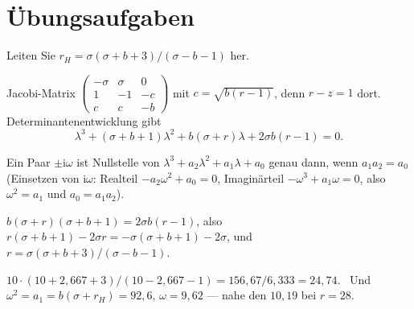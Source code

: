 \section{Übungsaufgaben}

\begin{aufgabe}
Leiten Sie $r_H = \sigma(\sigma + b + 3)/(\sigma - b - 1)$ her.

\loesung
{}
Jacobi-Matrix $\begin{pmatrix}-\sigma&\sigma&0\\ 1&-1&-c\\ c&c&-b\end{pmatrix}$ mit $c = \sqrt{b(r-1)}$, denn $r - z = 1$ dort. Determinantenentwicklung gibt
\[ \lambda^{3} + (\sigma + b + 1)\lambda^{2} + b(\sigma + r)\lambda + 2\sigma b(r - 1) = 0 . \]

Ein Paar $\pm\mathrm i\omega$ ist Nullstelle von $\lambda^{3} + a_2\lambda^{2} + a_1\lambda + a_0$ genau dann, wenn $a_1a_2 = a_0$ (Einsetzen von $\mathrm i\omega$: Realteil $-a_2\omega^{2} + a_0 = 0$, Imaginärteil $-\omega^{3} + a_1\omega = 0$, also $\omega^{2} = a_1$ und $a_0 = a_1a_2$).

$b(\sigma + r)(\sigma + b + 1) = 2\sigma b(r - 1)$, also $r(\sigma + b + 1) - 2\sigma r = -\sigma(\sigma + b + 1) - 2\sigma$, und $r = \sigma(\sigma + b + 3)/(\sigma - b - 1)$. \checkmark

$10\cdot(10 + 2{,}667 + 3)/(10 - 2{,}667 - 1) = 156{,}67/6{,}333 = 24{,}74$. \checkmark\ Und $\omega^{2} = a_1 = b(\sigma + r_H) = 92{,}6$, $\omega = 9{,}62$ --- nahe den $10{,}19$ bei $r = 28$. \checkmark
\end{aufgabe}

